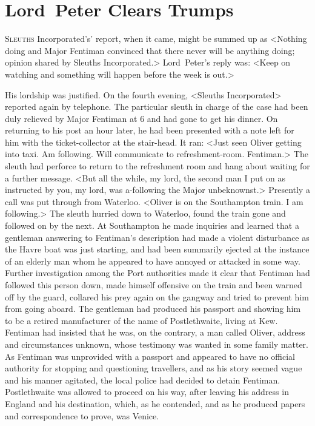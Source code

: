 \chapter{Lord~Peter Clears Trumps}
\lettrine[ante=‘]{S}{leuths} Incorporated's' report, when it came, might be summed up as <Nothing doing and Major Fentiman convinced that there never will be anything doing; opinion shared by Sleuths Incorporated.> Lord~Peter's reply was: <Keep on watching and something will happen before the week is out.>

His lordship was justified. On the fourth evening, <Sleuths Incorporated> reported again by telephone. The particular sleuth in charge of the case had been duly relieved by Major Fentiman at 6  and had gone to get his dinner. On returning to his post an hour later, he had been presented with a note left for him with the ticket-collector at the stair-head. It ran: <Just seen Oliver getting into taxi. Am following. Will communicate to refreshment-room. Fentiman.> The sleuth had perforce to return to the refreshment room and hang about waiting for a further message. <But all the while, my lord, the second man I put on as instructed by you, my lord, was a-following the Major unbeknownst.> Presently a call was put through from Waterloo. <Oliver is on the Southampton train. I am following.> The sleuth hurried down to Waterloo, found the train gone and followed on by the next. At Southampton he made inquiries and learned that a gentleman answering to Fentiman's description had made a violent disturbance as the Havre boat was just starting, and had been summarily ejected at the instance of an elderly man whom he appeared to have annoyed or attacked in some way. Further investigation among the Port authorities made it clear that Fentiman had followed this person down, made himself offensive on the train and been warned off by the guard, collared his prey again on the gangway and tried to prevent him from going aboard. The gentleman had produced his passport and  showing him to be a retired manufacturer of the name of Postlethwaite, living at Kew. Fentiman had insisted that he was, on the contrary, a man called Oliver, address and circumstances unknown, whose testimony was wanted in some family matter. As Fentiman was unprovided with a passport and appeared to have no official authority for stopping and questioning travellers, and as his story seemed vague and his manner agitated, the local police had decided to detain Fentiman. Postlethwaite was allowed to proceed on his way, after leaving his address in England and his destination, which, as he contended, and as he produced papers and correspondence to prove, was Venice.

